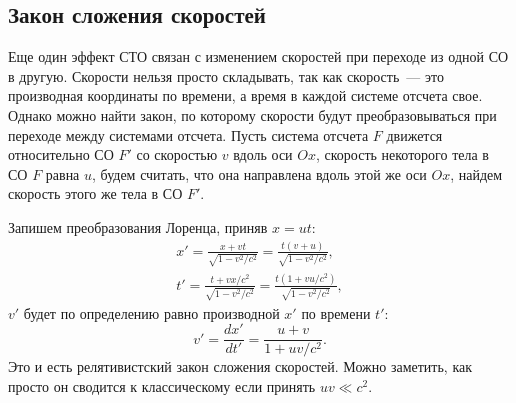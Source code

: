\subsection{Закон сложения скоростей}
Еще один эффект СТО связан с изменением скоростей при переходе из одной СО в другую. Скорости нельзя просто складывать, так как скорость~--- это производная координаты по времени, а время в каждой системе отсчета свое. Однако можно найти закон, по которому скорости будут преобразовываться при переходе между системами отсчета. Пусть система отсчета $F$ движется относительно СО $F'$ со скоростью $v$ вдоль оси $Ox$, скорость некоторого тела в СО $F$ равна $u$, будем считать, что она направлена вдоль этой же оси $Ox$, найдем скорость этого же тела в СО $F'$.

Запишем преобразования Лоренца, приняв $x = ut$:
\begin{gather*}
    x' 
        = \frac{x + v t}{\sqrt{1 - v^2 / c^2}} 
        = \frac{t (v + u)}{\sqrt{1 - v^2 / c^2}}, \\
    t' 
        = \frac{t + v x / c^2}{\sqrt{1 - v^2 / c^2}} 
        = \frac{t \left( 1 + v u / c^2 \right)}{\sqrt{1 - v^2 / c^2}},
\end{gather*}
$v'$ будет по определению равно производной $x'$ по времени $t'$:
\begin{equation}
	v' 
	   = \frac{d x'}{d t'} 
	   = \frac{u + v}{1 + u v / c^2}.
\end{equation}
Это и есть релятивистский закон сложения скоростей. Можно заметить, как просто он сводится к классическому если принять $u v \ll c^2$.